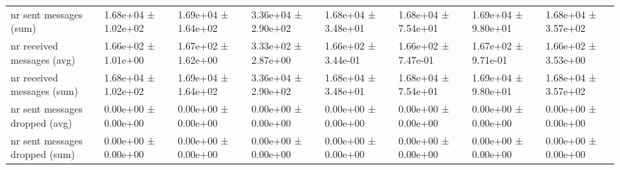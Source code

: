 \begin{tabular}{llllllll}
 nr sent messages (sum)             & 1.68e+04 ± 1.02e+02 & 1.69e+04 ± 1.64e+02 & 3.36e+04 ± 2.90e+02 & 1.68e+04 ± 3.48e+01 & 1.68e+04 ± 7.54e+01 & 1.69e+04 ± 9.80e+01 & 1.68e+04 ± 3.57e+02 \\
 nr received messages (avg)         & 1.66e+02 ± 1.01e+00 & 1.67e+02 ± 1.62e+00 & 3.33e+02 ± 2.87e+00 & 1.66e+02 ± 3.44e-01 & 1.66e+02 ± 7.47e-01 & 1.67e+02 ± 9.71e-01 & 1.66e+02 ± 3.53e+00 \\
 nr received messages (sum)         & 1.68e+04 ± 1.02e+02 & 1.69e+04 ± 1.64e+02 & 3.36e+04 ± 2.90e+02 & 1.68e+04 ± 3.48e+01 & 1.68e+04 ± 7.54e+01 & 1.69e+04 ± 9.80e+01 & 1.68e+04 ± 3.57e+02 \\
 nr sent messages dropped (avg)     & 0.00e+00 ± 0.00e+00 & 0.00e+00 ± 0.00e+00 & 0.00e+00 ± 0.00e+00 & 0.00e+00 ± 0.00e+00 & 0.00e+00 ± 0.00e+00 & 0.00e+00 ± 0.00e+00 & 0.00e+00 ± 0.00e+00 \\
 nr sent messages dropped (sum)     & 0.00e+00 ± 0.00e+00 & 0.00e+00 ± 0.00e+00 & 0.00e+00 ± 0.00e+00 & 0.00e+00 ± 0.00e+00 & 0.00e+00 ± 0.00e+00 & 0.00e+00 ± 0.00e+00 & 0.00e+00 ± 0.00e+00 \\
\hline
\end{tabular}
